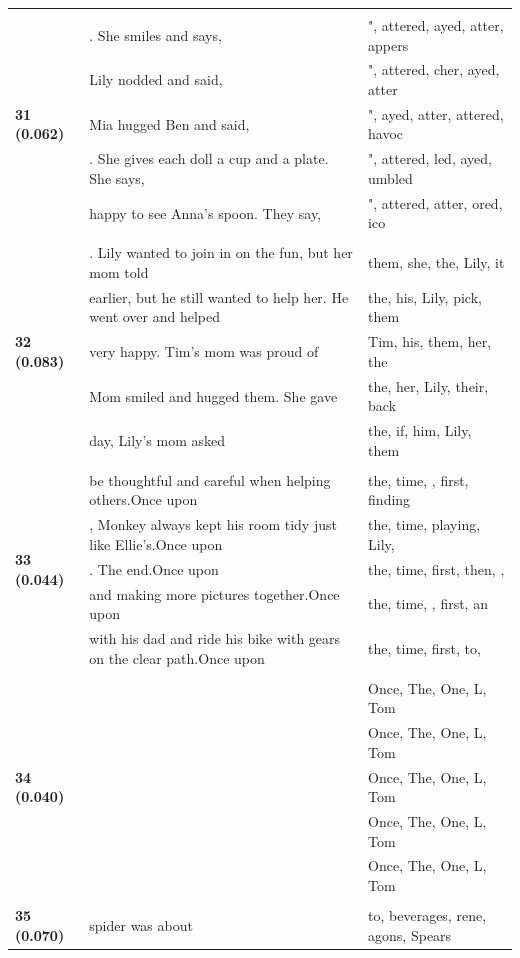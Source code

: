 \documentclass{article}
\theoremstyle{plain}
\theoremstyle{definition}
\theoremstyle{remark}
\begin{document}
\begin{longtable}{|p{}|p{}|p{}|}
& & \\
\multirow{5}{*}{\textbf{31 (0.062)}} & . She smiles and says, & ", attered, ayed, atter, appers \\
& Lily nodded and said, & ", attered, cher, ayed, atter \\
& Mia hugged Ben and said, & ", ayed, atter, attered,  havoc \\
& . She gives each doll a cup and a plate. She says, & ", attered, led, ayed, umbled \\
& happy to see Anna's spoon. They say, & ", attered, atter, ored, ico \\
& & \\
\multirow{5}{*}{\textbf{32 (0.083)}} & . Lily wanted to join in on the fun, but her mom told & them,  she,  the,  Lily,  it \\
& earlier, but he still wanted to help her. He went over and helped & the,  his,  Lily,  pick,  them \\
& very happy. Tim's mom was proud of & Tim,  his,  them,  her,  the \\
& Mom smiled and hugged them. She gave & the,  her,  Lily,  their,  back \\
& day, Lily's mom asked & the,  if,  him,  Lily,  them \\
& & \\
\multirow{5}{*}{\textbf{33 (0.044)}} & be thoughtful and careful when helping others.Once upon & the,  time,  ,  first,  finding \\
& , Monkey always kept his room tidy just like Ellie's.Once upon & the,  time,  playing,  Lily, \\
& . The end.Once upon & the,  time,  first,  then, , \\
& and making more pictures together.Once upon & the,  time,  ,  first,  an \\
& with his dad and ride his bike with gears on the clear path.Once upon & the,  time,  first,  to, \\
& & \\
\multirow{5}{*}{\textbf{34 (0.040)}} &  & Once, The, One, L, Tom \\
&  & Once, The, One, L, Tom \\
&  & Once, The, One, L, Tom \\
&  & Once, The, One, L, Tom \\
&  & Once, The, One, L, Tom \\
& & \\
\multirow{5}{*}{\textbf{35 (0.070)}} & spider was about & to,  beverages, rene, agons,  Spears \\

\end{longtable}
\end{document}
